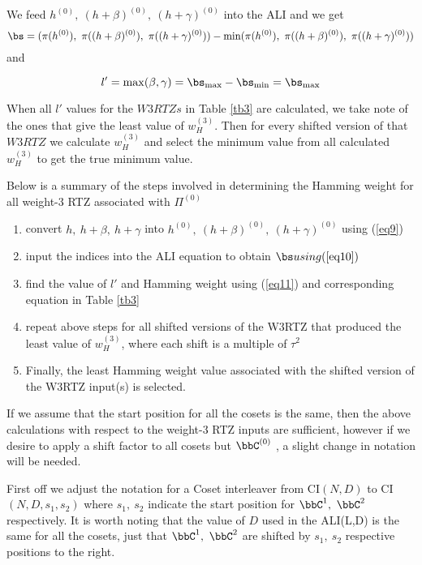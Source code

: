  We feed $h^{(0)},~(h+\beta)^{(0)},~(h+\gamma)^{(0)}$ into the ALI and we get \begin{equation}
 \bs=(\pi(h^{(0)}),~\pi((h+\beta)^{(0)}),~\pi((h+\gamma)^{(0)}))-\min(\pi(h^{(0)}),~\pi((h+\beta)^{(0)}),~\pi((h+\gamma)^{(0)}))
 \label{eq10}
 \end{equation}
  and 
 
 \begin{equation}
 l'=\max(\beta,\gamma)= \bs_{\max}-\bs_{\min}=\bs_{\max}
 \label{eq11}
 \end{equation}
 
 When all $l'$ values for the $W3RTZs$ in Table \ref{tb3} are calculated, we take note of the ones that give the least value of $w_H^{(3)}$. Then for every shifted version of that $W3RTZ$ we calculate  $w_H^{(3)}$ and select the minimum value from all calculated $w_H^{(3)}$ to get the true minimum value.
 
 Below is a summary of the steps involved in determining the Hamming weight for all weight-$3$ RTZ associated with $\Pi^{(0)}$ 
 \begin{enumerate}
 \item convert  $h,~h+\beta,~h+\gamma$ into $h^{(0)},~(h+\beta)^{(0)},~(h+\gamma)^{(0)}$ using (\ref{eq9})
 
 \item input the indices into the ALI equation to obtain $\bs using (\ref{eq10})$
 
 \item find the value of $l'$ and  Hamming weight using (\ref{eq11}) and corresponding equation in Table \ref{tb3}
 
 \item repeat above steps for all shifted versions of the W3RTZ that produced the least value of $w_H^{(3)}$, where each shift is a multiple of $\tau^2$
 
\item Finally, the least Hamming weight value associated with the shifted version of the W3RTZ input(s) is selected.
 \end{enumerate}
 
 
 If we assume that the start position for all the cosets is the same, then the above calculations with respect to the weight-$3$ RTZ inputs are sufficient, however if we desire to apply a shift factor to all cosets but $\bbC^{(0)}$ , a slight change in notation will be needed. 
 
 First off we adjust the notation for a Coset interleaver from CI$(N,D)$ to CI$(N,D,s_1,s_2)$ where $s_1,~s_2$ indicate the start position for $\bbC^1,~\bbC^2$ respectively. It is worth noting that the value of $D$ used in the ALI(L,D) is the same for all the cosets, just that $\bbC^1,~\bbC^2$ are shifted by  $s_1,~s_2$ respective positions to the right.
 
